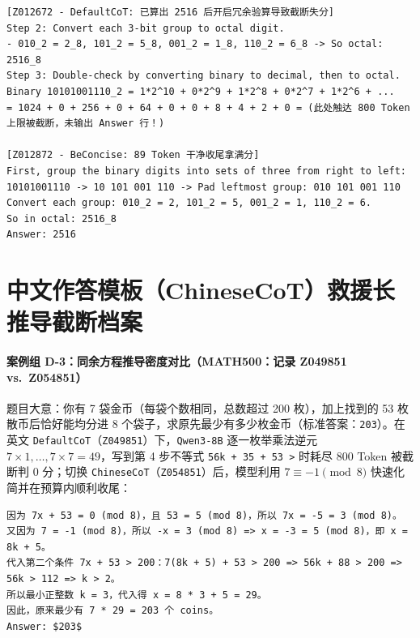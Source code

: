 \begin{lstlisting}[language={}, numbers=none, caption={记录 Z012672 摘录（DefaultCoT，800 Token，finish\_reason=length，得分 0） vs.\ Z012872（BeConcise，89 Token，得分 1）}]
[Z012672 - DefaultCoT: 已算出 2516 后开启冗余验算导致截断失分]
Step 2: Convert each 3-bit group to octal digit.
- 010_2 = 2_8, 101_2 = 5_8, 001_2 = 1_8, 110_2 = 6_8 -> So octal: 2516_8
Step 3: Double-check by converting binary to decimal, then to octal.
Binary 10101001110_2 = 1*2^10 + 0*2^9 + 1*2^8 + 0*2^7 + 1*2^6 + ...
= 1024 + 0 + 256 + 0 + 64 + 0 + 0 + 8 + 4 + 2 + 0 = (此处触达 800 Token 上限被截断，未输出 Answer 行！)

[Z012872 - BeConcise: 89 Token 干净收尾拿满分]
First, group the binary digits into sets of three from right to left:
10101001110 -> 10 101 001 110 -> Pad leftmost group: 010 101 001 110
Convert each group: 010_2 = 2, 101_2 = 5, 001_2 = 1, 110_2 = 6.
So in octal: 2516_8
Answer: 2516
\end{lstlisting}

\section{中文作答模板（ChineseCoT）救援长推导截断档案}

\paragraph{案例组 D-3：同余方程推导密度对比（MATH500：记录 Z049851 vs.\ Z054851）}题目大意：你有 7 袋金币（每袋个数相同，总数超过 200 枚），加上找到的 53 枚散币后恰好能均分进 8 个袋子，求原先最少有多少枚金币（标准答案：\texttt{203}）。在英文 \texttt{DefaultCoT}（\texttt{Z049851}）下，\texttt{Qwen3-8B} 逐一枚举乘法逆元 $7\times 1,\dots,7\times 7=49$，写到第 4 步不等式 \texttt{56k + 35 + 53 >} 时耗尽 800 Token 被截断判 0 分；切换 \texttt{ChineseCoT}（\texttt{Z054851}）后，模型利用 $7 \equiv -1 \pmod 8$ 快速化简并在预算内顺利收尾：

\begin{lstlisting}[language={}, numbers=none, caption={记录 Z054851 核心推导摘录（qwen3 / math500 / ChineseCoT，正常 stop，得分 1）}]
因为 7x + 53 = 0 (mod 8)，且 53 = 5 (mod 8)，所以 7x = -5 = 3 (mod 8)。
又因为 7 = -1 (mod 8)，所以 -x = 3 (mod 8) => x = -3 = 5 (mod 8)，即 x = 8k + 5。
代入第二个条件 7x + 53 > 200：7(8k + 5) + 53 > 200 => 56k + 88 > 200 => 56k > 112 => k > 2。
所以最小正整数 k = 3，代入得 x = 8 * 3 + 5 = 29。
因此，原来最少有 7 * 29 = 203 个 coins。
Answer: $203$
\end{lstlisting}

